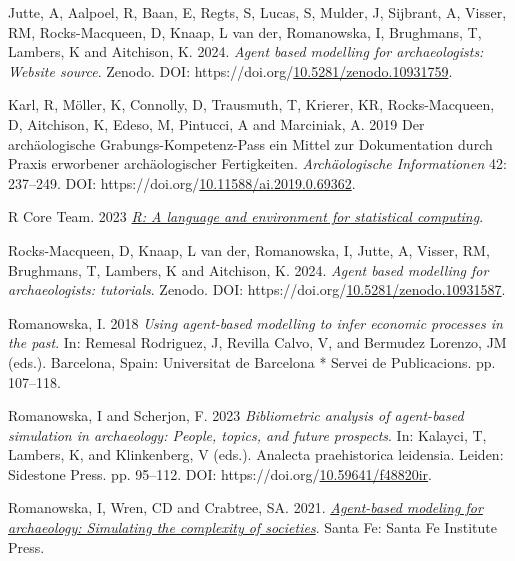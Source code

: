 \documentclass[
]{article}
\newlength{\cslhangindent}
\newlength{\cslentryspacingunit} %
\newenvironment{CSLReferences}[2] %
 {%
  \setlength{\parindent}{0pt}
  \ifodd #1
  \let\oldpar\par
  \def\par{\hangindent=\cslhangindent\oldpar}
  \fi
  \setlength{\parskip}{#2\cslentryspacingunit}
 }%
 {}
\begin{document}
\begin{CSLReferences}{1}{0}
\leavevmode{}%
Jutte, A, Aalpoel, R, Baan, E, Regts, S, Lucas, S, Mulder, J, Sijbrant, A, Visser, RM, Rocks-Macqueen, D, Knaap, L van der, Romanowska, I, Brughmans, T, Lambers, K and Aitchison, K. 2024. \emph{Agent based modelling for archaeologists: Website source}. Zenodo. DOI: https://doi.org/\href{https://doi.org/10.5281/zenodo.10931759}{10.5281/zenodo.10931759}.

\leavevmode{}%
Karl, R, Möller, K, Connolly, D, Trausmuth, T, Krierer, KR, Rocks-Macqueen, D, Aitchison, K, Edeso, M, Pintucci, A and Marciniak, A. 2019 Der archäologische Grabungs-Kompetenz-Pass {\textendash} ein Mittel zur Dokumentation durch Praxis erworbener archäologischer Fertigkeiten. \emph{Archäologische Informationen} 42: 237--249. DOI: https://doi.org/\href{https://doi.org/10.11588/ai.2019.0.69362}{10.11588/ai.2019.0.69362}.

\leavevmode{}%
R Core Team. 2023 \emph{\href{https://www.R-project.org/}{R: A language and environment for statistical computing}}.

\leavevmode{}%
Rocks-Macqueen, D, Knaap, L van der, Romanowska, I, Jutte, A, Visser, RM, Brughmans, T, Lambers, K and Aitchison, K. 2024. \emph{Agent based modelling for archaeologists: tutorials}. Zenodo. DOI: https://doi.org/\href{https://doi.org/10.5281/zenodo.10931587}{10.5281/zenodo.10931587}.

\leavevmode{}%
Romanowska, I. 2018 \emph{Using agent-based modelling to infer economic processes in the past}. In: Remesal Rodriguez, J, Revilla Calvo, V, and Bermudez Lorenzo, JM (eds.). Barcelona, Spain: Universitat de Barcelona * Servei de Publicacions. pp. 107--118.

\leavevmode{}%
Romanowska, I and Scherjon, F. 2023 \emph{Bibliometric analysis of agent-based simulation in archaeology: People, topics, and future prospects}. In: Kalayci, T, Lambers, K, and Klinkenberg, V (eds.). Analecta praehistorica leidensia. Leiden: Sidestone Press. pp. 95--112. DOI: https://doi.org/\href{https://doi.org/10.59641/f48820ir}{10.59641/f48820ir}.

\leavevmode{}%
Romanowska, I, Wren, CD and Crabtree, SA. 2021. \emph{\href{https://www.sfipress.org/books/agent-based-modeling-archaeology}{Agent-based modeling for archaeology: Simulating the complexity of societies}}. Santa Fe: Santa Fe Institute Press.


\end{CSLReferences}
\end{document}
